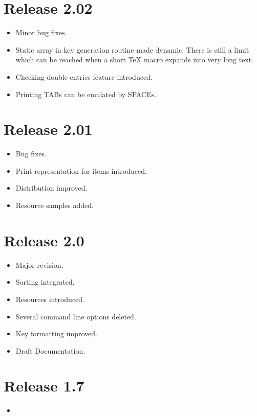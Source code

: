 \documentclass[11pt,a4paper]{scrartcl}
\newenvironment{Release}[2]{\section*{Release #1}\begin{itemize}}{\end{itemize}}
\newenvironment{Fix}[1]{\item }{}
\newenvironment{New}[1]{\item }{}
\newenvironment{Doc}[1]{\item }{}
\newenvironment{Update}[1]{\item }{}
\begin{document}
 \begin{Release}{2.02}{}
  \begin{Fix}{gene}
    Minor bug fixes.
  \end{Fix}
  \begin{Update}{gene}
    Static array in key generation routine made dynamic. There is
    still a limit which can be reached when a short \TeX{} macro
    expands into very long text.
  \end{Update}
  \begin{New}{gene}
    Checking double entries feature introduced.
  \end{New}
  \begin{New}{gene}
    Printing TABs can be emulated by SPACEs.
  \end{New}
 \end{Release}

 \begin{Release}{2.01}{}
  \begin{Fix}{gene}
    Bug fixes.
  \end{Fix}
  \begin{New}{gene}
    Print representation for items introduced.
  \end{New}
  \begin{Update}{gene}
    Distribution improved.
  \end{Update}
  \begin{New}{gene}
    Resource samples added.
  \end{New}
 \end{Release}

 \begin{Release}{2.0}{}
  \begin{New}{gene}
    Major revision.
  \end{New}
  \begin{New}{gene}
    Sorting integrated.
  \end{New}
  \begin{New}{gene}
    Resources introduced.
  \end{New}
  \begin{Update}{gene}
    Several command line options deleted.
  \end{Update}
  \begin{Update}{gene}
    Key formatting improved.
  \end{Update}
  \begin{Doc}{gene}
    Draft Documentation.
  \end{Doc}
 \end{Release}

 \begin{Release}{1.7}{}
  \item[]
 \end{Release}
\end{document}
